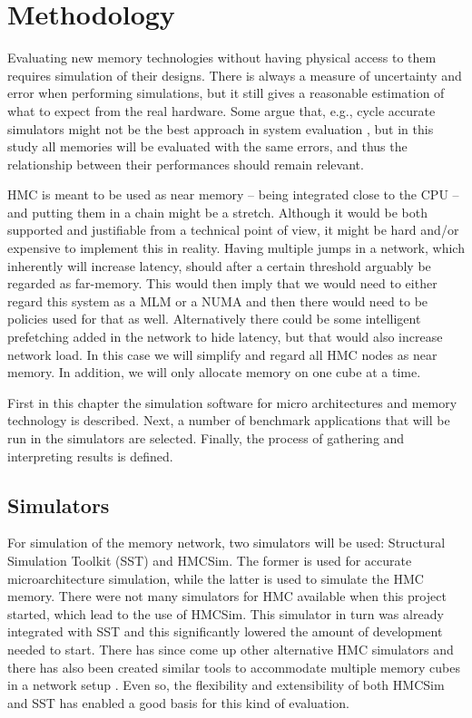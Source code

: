 \chapter{Methodology}
Evaluating new memory technologies without having physical access to them requires simulation of their designs. There is always a measure of uncertainty and error when performing simulations, but it still gives a reasonable estimation of what to expect from the real hardware. Some argue that, e.g., cycle accurate simulators might not be the best approach in system evaluation \cite{weaver2008cycle}, but in this study all memories will be evaluated with the same errors, and thus the relationship between their performances should remain relevant. 
\bigskip

HMC is meant to be used as near memory -- being integrated close to the CPU -- and putting them in a chain might be a stretch. Although it would be both supported and justifiable from a technical point of view, it might be hard and/or expensive to implement this in reality. Having multiple jumps in a network, which inherently will increase latency, should after a certain threshold arguably be regarded as far-memory. This would then imply that we would need to either regard this system as a MLM or a NUMA and then there would need to be policies used for that as well. Alternatively there could be some intelligent prefetching added in the network to hide latency, but that would also increase network load. In this case we will simplify and regard all HMC nodes as near memory. In addition, we will only allocate memory on one cube at a time.
\bigskip

First in this chapter the simulation software for micro architectures and memory technology is described. Next, a number of benchmark applications that will be run in the simulators are selected. Finally, the process of gathering and interpreting results is defined.


\section{Simulators}
For simulation of the memory network, two simulators will be used: Structural Simulation Toolkit (SST) and HMCSim. The former is used for accurate microarchitecture simulation, while the latter is used to simulate the HMC memory. There were not many simulators for HMC available when this project started, which lead to the use of HMCSim. This simulator in turn was already integrated with SST and this significantly lowered the amount of development needed to start. There has since come up other alternative HMC simulators \cite{7544479} \cite{Yang:2018:HCH:3240302.3240319} and there has also been created similar tools to accommodate multiple memory cubes in a network setup \cite{Siegl:2017:BAF:3132402.3132403}. Even so, the flexibility and extensibility of both HMCSim and SST has enabled a good basis for this kind of evaluation.
\bigskip

